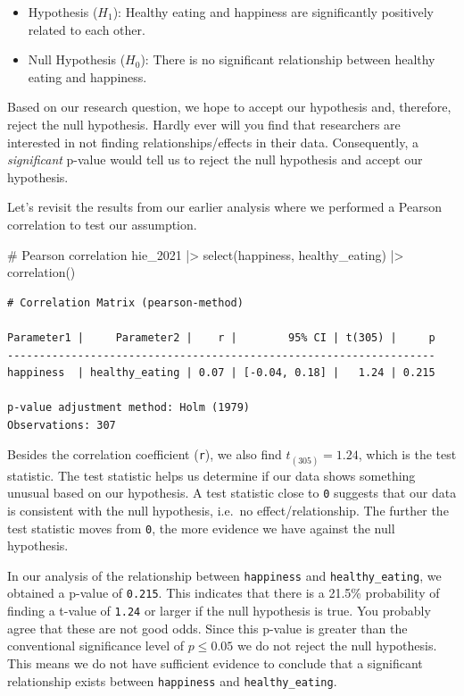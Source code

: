 \documentclass[
  letterpaper,
]{krantz}
\makeatletter
\newenvironment{Shaded}{\begin{snugshade}}{\end{snugshade}}
\newcommand{\CommentTok}[1]{\textcolor[rgb]{0.37,0.37,0.37}{#1}}
\newcommand{\FunctionTok}[1]{\textcolor[rgb]{0.28,0.35,0.67}{#1}}
\newcommand{\NormalTok}[1]{\textcolor[rgb]{0.00,0.23,0.31}{#1}}
\newcommand{\SpecialCharTok}[1]{\textcolor[rgb]{0.37,0.37,0.37}{#1}}
\newenvironment{kframe}{%
\medskip{}
\setlength{\fboxsep}{.8em}
 \def\at@end@of@kframe{}%
 \ifinner\ifhmode%
  \def\at@end@of@kframe{\end{minipage}}%
  \begin{minipage}{\columnwidth}%
 \fi\fi%
 \def\FrameCommand##1{\hskip\@totalleftmargin \hskip-\fboxsep
 \colorbox{shadecolor}{##1}\hskip-\fboxsep
     \hskip-\linewidth \hskip-\@totalleftmargin \hskip\columnwidth}%
 \MakeFramed {\advance\hsize-\width
   \@totalleftmargin\z@ \linewidth\hsize
   \@setminipage}}%
 {\par\unskip\endMakeFramed%
 \at@end@of@kframe}
\renewenvironment{Shaded}{\begin{kframe}}{\end{kframe}}
\makeatother
\begin{document}
\begin{itemize}
\item
  Hypothesis (\(H_1\)): Healthy eating and happiness are significantly
  positively related to each other.
\item
  Null Hypothesis (\(H_0\)): There is no significant relationship
  between healthy eating and happiness.
\end{itemize}

Based on our research question, we hope to accept our hypothesis and,
therefore, reject the null hypothesis. Hardly ever will you find that
researchers are interested in not finding relationships/effects in their
data. Consequently, a \emph{significant} p-value would tell us to reject
the null hypothesis and accept our hypothesis.

Let's revisit the results from our earlier analysis where we performed a
Pearson correlation to test our assumption.

\begin{Shaded}
\begin{Highlighting}[]
\CommentTok{\# Pearson correlation}
\NormalTok{hie\_2021 }\SpecialCharTok{|\textgreater{}}
  \FunctionTok{select}\NormalTok{(happiness, healthy\_eating) }\SpecialCharTok{|\textgreater{}}
  \FunctionTok{correlation}\NormalTok{()}
\end{Highlighting}
\end{Shaded}

\begin{verbatim}
# Correlation Matrix (pearson-method)

Parameter1 |     Parameter2 |    r |        95% CI | t(305) |     p
-------------------------------------------------------------------
happiness  | healthy_eating | 0.07 | [-0.04, 0.18] |   1.24 | 0.215

p-value adjustment method: Holm (1979)
Observations: 307
\end{verbatim}

Besides the correlation coefficient (\texttt{r}), we also find
\(t_{(305)} = 1.24\), which is the test statistic. The test statistic
helps us determine if our data shows something unusual based on our
hypothesis. A test statistic close to \texttt{0} suggests that our data
is consistent with the null hypothesis, i.e.~no effect/relationship. The
further the test statistic moves from \texttt{0}, the more evidence we
have against the null hypothesis.

In our analysis of the relationship between \texttt{happiness} and
\texttt{healthy\_eating}, we obtained a p-value of \texttt{0.215}. This
indicates that there is a 21.5\% probability of finding a t-value of
\texttt{1.24} or larger if the null hypothesis is true. You probably
agree that these are not good odds. Since this p-value is greater than
the conventional significance level of \(p \leq 0.05\) we do not reject
the null hypothesis. This means we do not have sufficient evidence to
conclude that a significant relationship exists between
\texttt{happiness} and \texttt{healthy\_eating}.
\end{document}
